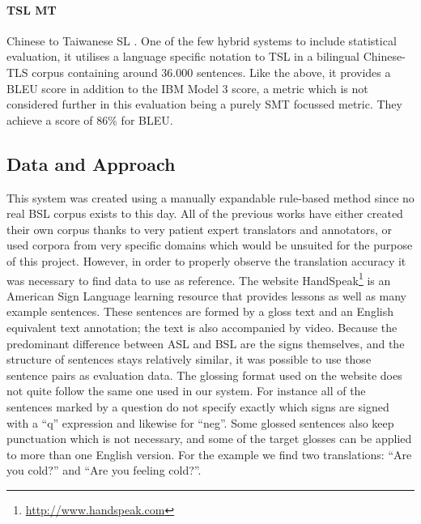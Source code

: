 \documentclass[12pt]{ociamthesis}  %
\begin{document}
\paragraph{TSL MT} Chinese to Taiwanese SL . One of the few hybrid systems to include statistical evaluation, it utilises a language specific notation to TSL in a bilingual Chinese-TLS corpus containing around 36.000 sentences. Like the above, it provides a BLEU score in addition to the IBM Model 3 score, a metric which is not considered further in this evaluation being a purely SMT focussed metric. They achieve a score of 86\% for BLEU.

\subsection{Data and Approach}
This system was created using a manually expandable rule-based method since no real BSL corpus exists to this day. All of the previous works have either created their own corpus thanks to very patient expert translators and annotators, or used corpora from very specific domains which would be unsuited for the purpose of this project. However, in order to properly observe the translation accuracy it was necessary to find data to use as reference. The website HandSpeak\footnote{\url{http://www.handspeak.com}} is an American Sign Language learning resource that provides lessons as well as many example sentences. These sentences are formed by a gloss text and an English equivalent text annotation; the text is also accompanied by video. Because the predominant difference between ASL and BSL are the signs themselves, and the structure of sentences stays relatively similar, it was possible to use those sentence pairs as evaluation data. The glossing format used on the website does not quite follow the same one used in our system. For instance all of the sentences marked by a question do not specify exactly which signs are signed with a ``q'' expression and likewise for ``neg''. Some glossed sentences also keep punctuation which is not necessary, and some of the target glosses can be applied to more than one English version. For the example  we find two  translations: ``Are you cold?'' and ``Are you feeling cold?''. 
\end{document}
